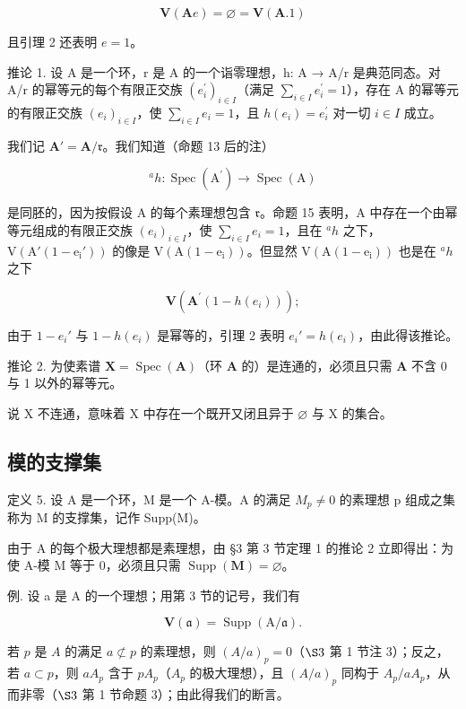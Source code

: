 \[
\mathbf {V} (\mathbf {A} e) = \varnothing = \mathbf {V} (\mathbf {A}. 1)
\]

且引理 2 还表明 \(e = 1\)。

推论 1. 设 A 是一个环，r 是 A 的一个诣零理想，h: A → A/r 是典范同态。对 A/r 的幂等元的每个有限正交族 \((e_{i}^{\prime})_{i\in I}\)（满足 \(\sum_{i\in I} e_{i}^{\prime}=1\)），存在 A 的幂等元的有限正交族 \((e_{i})_{i\in I}\)，使 \(\sum_{i\in I} e_{i}=1\)，且 \(h(e_{i})=e_{i}^{\prime}\) 对一切 \(i\in I\) 成立。

我们记 \(\mathbf{A}' = \mathbf{A} / \mathfrak{r}\)。我们知道（命题 13 后的注）

\[
^ {a} h \colon \operatorname{Spec} (\mathrm{A} ^ {\prime}) \rightarrow \operatorname{Spec} (\mathrm{A})
\]

是同胚的，因为按假设 A 的每个素理想包含 \(\mathfrak{r}\)。命题 15 表明，A 中存在一个由幂等元组成的有限正交族 \((e_i)_{i\in I}\)，使 \(\sum_{i\in I}e_i = 1\)，且在 \(^ah\) 之下，\(\mathrm{V(A'(1 - e_i'))}\) 的像是 \(\mathrm{V(A(1 - e_i))}\)。但显然 \(\mathrm{V(A(1 - e_i))}\) 也是在 \(^ah\) 之下

\[
\mathbf {V} (\mathbf {A} ^ {\prime} (1 - h (e _ {i})))  ;
\]

由于 \(1 - e_i'\) 与 \(1 - h(e_i)\) 是幂等的，引理 2 表明 \(e_i' = h(e_i)\)，由此得该推论。

推论 2. 为使素谱 \(\mathbf{X} = \operatorname{Spec}(\mathbf{A})\)（环 \(\mathbf{A}\) 的）是连通的，必须且只需 \(\mathbf{A}\) 不含 0 与 1 以外的幂等元。

说 X 不连通，意味着 X 中存在一个既开又闭且异于 \(\varnothing\) 与 X 的集合。

\subsection{模的支撑集}

定义 5. 设 A 是一个环，M 是一个 A-模。A 的满足 \(M_{p} \neq 0\) 的素理想 p 组成之集称为 M 的支撑集，记作 Supp(M)。

由于 A 的每个极大理想都是素理想，由 §3 第 3 节定理 1 的推论 2 立即得出：为使 A-模 M 等于 0，必须且只需 \(\operatorname{Supp}(\mathbf{M}) = \varnothing\)。

例. 设 a 是 A 的一个理想；用第 3 节的记号，我们有

\[
\mathbf {V} (\mathfrak {a}) = \operatorname{Supp} (\mathrm{A} / \mathfrak {a}).\tag{9}
\]

若 \(p\) 是 \(A\) 的满足 \(a \not\subset p\) 的素理想，则 \((A/a)_p = 0\)（\(\S 3\) 第 1 节注 3）；反之，若 \(a \subset p\)，则 \(aA_p\) 含于 \(pA_p\)（\(A_p\) 的极大理想），且 \((A/a)_p\) 同构于 \(A_p/aA_p\)，从而非零（\(\S 3\) 第 1 节命题 3）；由此得我们的断言。

